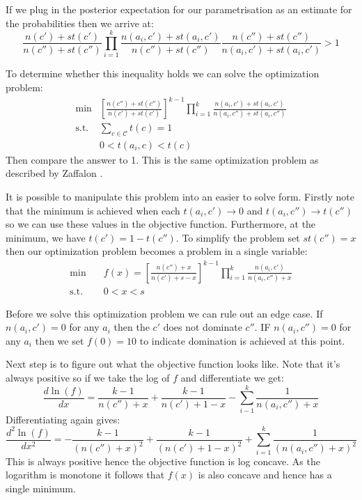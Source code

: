 If we plug in the posterior expectation for our parametrisation as an estimate for the probabilities then we arrive at:
\begin{equation}
	\frac{n(c')+st(c')}{n(c'')+st(c'')} \prod_{i=1}^k \frac{n(a_i, c') + st(a_i , c')}{n(c'') + st(c'')} \frac{n(c'') + st(c'')}{n(a_i, c') + st(a_i , c')} > 1
\end{equation}

To determine whether this inequality holds we can solve the optimization problem:
\begin{align}
	\min & \left[ \frac{n(c'')+st(c'')}{n(c')+st(c')} \right]^{k-1} \prod_{i=1}^k \frac{n(a_i, c') + st(a_i , c')}{n(a_i, c'') + st(a_i , c'')} \\
	\text{s.t.} & \sum_{c \in \mathcal{C}} t(c) = 1 \\
	& 0 < t(a_i, c) < t(c)
\end{align}
Then compare the answer to 1.
This is the same optimization problem as described by Zaffalon \cite{Zaffalon01}.

It is possible to manipulate this problem into an easier to solve form.
Firstly note that the minimum is achieved when each $t(a_i, c') \rightarrow 0$ and $t(a_i, c'') \rightarrow t(c'')$ so we can use these values in the objective function.
Furthermore, at the minimum, we have $t(c') = 1 - t(c'')$.
To simplify the problem set $st(c'') = x$ then our optimization problem becomes a problem in a single variable:
\begin{align} \label{Credal Dominance Test}
	\min \quad & f(x) = \left[ \frac{n(c'') + x}{n(c') + s - x} \right]^{k-1} \prod_{i=1}^k \frac{n(a_i, c')}{n(a_i, c'') + x} \\
	\text{s.t.} \quad & 0 < x < s
\end{align}

Before we solve this optimization problem we can rule out an edge case.
If $n(a_i, c')=0$ for any $a_i$ then the $c'$ does not dominate $c''$.
IF $n(a_i, c'')=0$ for any $a_i$ then we set $f(0)=10$ to indicate domination is achieved at this point.

Next step is to figure out what the objective function looks like.
Note that it's always positive so if we take the log of $f$ and differentiate we get:
\begin{equation}
	\frac{d\ln(f)}{dx} = \frac{k-1}{n(c'')+x} + \frac{k-1}{n(c')+1-x} - \sum_{i-1}^k \frac{1}{n(a_i, c'') + x}
\end{equation}
Differentiating again gives:
\begin{equation}
	\frac{d^2\ln(f)}{dx^2} = -\frac{k-1}{(n(c'') + x)^2} + \frac{k-1}{(n(c')+1-x)^2} + \sum_{i=1}^k \frac{1}{(n(a_i, c'') + x)^2}
\end{equation}
This is always positive hence the objective function is log concave.
As the logarithm is monotone it follows that $f(x)$ is also concave and hence has a single minimum.

